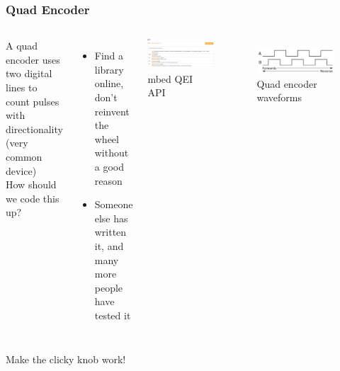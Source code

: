 \documentclass{beamer}
\begin{document}
\begin{frame}
\frametitle{Quad Encoder}
\begin{columns}[t]
  A quad encoder uses two digital lines to count pulses with directionality \\
  (very common device) \\
  \hfill \break
  How should we code this up?
   {
  \begin{itemize}
    \item Find a library online, don't reinvent the wheel {\tiny without a good reason}
    \item Someone else has written it, and many more people have tested it
  \end{itemize}
  \centering
  \includegraphics[width = 0.9\columnwidth]{external/mbed-qei-api} \\
  mbed QEI API \\
  }
  \begin{figure}
    \centering
    \includegraphics[width = 0.9\columnwidth]{images/quad-encoder} \\
    Quad encoder waveforms \\

  \end{figure}
\end{columns}
\end{frame}

\begin{frame}
\centering \huge Make the clicky knob work!
\end{frame}
\end{document}
